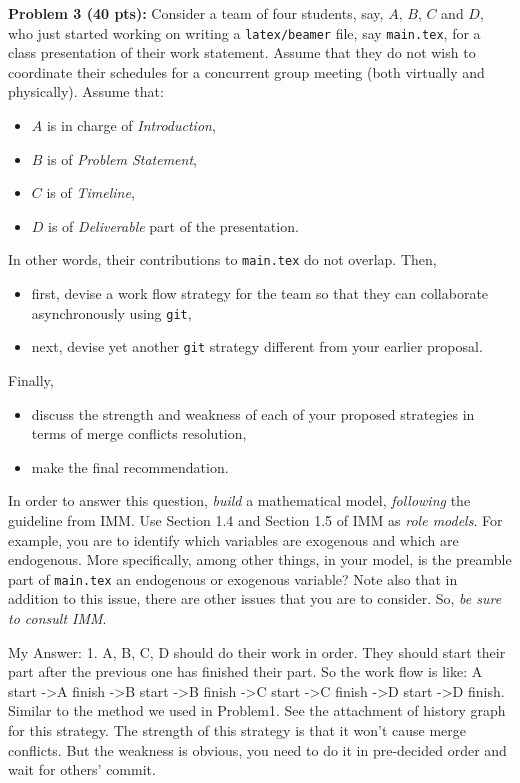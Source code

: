 \documentclass[12pt]{article}
\begin{document}
\newpage
\noindent\textbf{Problem 3 (40 pts):}
Consider a team of four students, say, $A$, $B$, $C$ and $D$, 
who just started working 
on writing a \texttt{latex/beamer} file, say \texttt{main.tex}, 
for a class presentation of their work statement.  
Assume that they do not wish to coordinate their schedules for a
concurrent group meeting (both virtually and physically).  
Assume that:
\begin{itemize}
\item $A$ is in charge of \emph{Introduction},
\item $B$ is of \emph{Problem Statement}, 
\item $C$ is of  \emph{Timeline},
\item $D$ is of \emph{Deliverable} part of the presentation.  
\end{itemize}
In other words, their contributions to \texttt{main.tex} do not overlap.
Then, 
\begin{itemize}
\item first, devise a work flow strategy for the team so that they can
  collaborate asynchronously using \texttt{git},
\item next, devise yet another \texttt{git} strategy different from your earlier
  proposal.  
\end{itemize}
Finally,
\begin{itemize}
\item discuss the strength and weakness of each of your proposed strategies in terms of merge
conflicts resolution,
\item make the final recommendation.  
\end{itemize}
In order to answer this question, \emph{build}
a mathematical model, \emph{following} the guideline from IMM. 
Use Section 1.4 and Section 1.5 of IMM as \emph{role models}.    
For example, you are to identify which variables  are exogenous 
and which are endogenous.  More specifically, among other things, 
in your model, is the preamble part of \texttt{main.tex} an endogenous 
or exogenous variable?  
Note also that in addition to this issue, there are other issues that
you are to consider.  So, \emph{be sure to consult IMM}. 

My Answer: 
1. A, B, C, D should do their work in order. They should start their part after the previous one has finished their part. So the work flow is like: A start ->A finish ->B start ->B finish ->C start ->C finish ->D start ->D finish. Similar to the method we used in Problem1. See the attachment of history graph for this strategy. The strength of this strategy is that it won't cause merge conflicts. But the weakness is obvious, you need to do it in pre-decided order and wait for others' commit.
\end{document}
